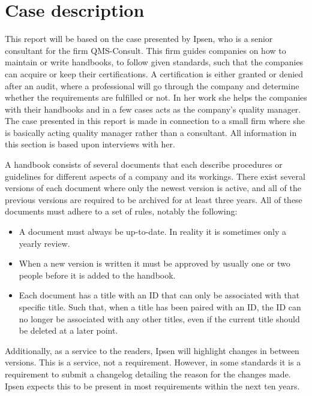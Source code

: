 \section{Case description} \label{sec:CaseDescription}

This report will be based on the case presented by Ipsen, who is a senior consultant for the firm QMS-Consult.
This firm guides companies on how to maintain or write handbooks, to follow given standards, such that the companies can acquire or keep their certifications.
A certification is either granted or denied after an audit, where a professional will go through the company and determine whether the requirements are fulfilled or not.
In her work she helps the companies with their handbooks and in a few cases acts as the company's quality manager.
The case presented in this report is made in connection to a small firm where she is basically acting quality manager rather than a consultant.
All information in this section is based upon interviews with her.

A handbook consists of several documents that each describe procedures or guidelines for different aspects of a company and its workings.
There exist several versions of each document where only the newest version is active, and all of the previous versions are required to be archived for at least three years.
All of these documents must adhere to a set of rules, notably the following:

\begin{itemize}
	\item
	A document must always be up-to-date.
	In reality it is sometimes only a yearly review.
	\item
	When a new version is written it must be approved by usually one or two people before it is added to the handbook.
	\item
	Each document has a title with an ID that can only be associated with that specific title.
	Such that, when a title has been paired with an ID, the ID can no longer be associated with any other titles, even if the current title should be deleted at a later point.
\end{itemize}

Additionally, as a service to the readers, Ipsen will highlight changes in between versions.
This is a service, not a requirement.
However, in some standards it is a requirement to submit a changelog detailing the reason for the changes made.
Ipsen expects this to be present in most requirements within the next ten years.


